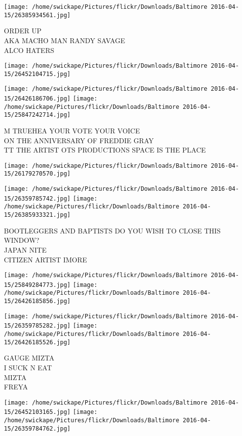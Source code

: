 \documentclass[10pt,letterpaper]{article}
\begin{document}
\texttt{[image: /home/swickape/Pictures/flickr/Downloads/Baltimore 2016-04-15/26385934561.jpg]}

ORDER UP\\
AKA MACHO MAN RANDY SAVAGE\\
ALCO HATERS
\pagebreak

\texttt{[image: /home/swickape/Pictures/flickr/Downloads/Baltimore 2016-04-15/26452104715.jpg]}

\vspace{0.25in}
\texttt{[image: /home/swickape/Pictures/flickr/Downloads/Baltimore 2016-04-15/26426186706.jpg]}
\texttt{[image: /home/swickape/Pictures/flickr/Downloads/Baltimore 2016-04-15/25847242714.jpg]}

M TRUEHEA YOUR VOTE YOUR VOICE\\
ON THE ANNIVERSARY OF FREDDIE GRAY\\
TT THE ARTIST OTS PRODUCTIONS SPACE IS THE PLACE
\pagebreak

\texttt{[image: /home/swickape/Pictures/flickr/Downloads/Baltimore 2016-04-15/26179270570.jpg]}

\vspace{0.25in}
\texttt{[image: /home/swickape/Pictures/flickr/Downloads/Baltimore 2016-04-15/26359785742.jpg]}
\texttt{[image: /home/swickape/Pictures/flickr/Downloads/Baltimore 2016-04-15/26385933321.jpg]}

BOOTLEGGERS AND BAPTISTS DO YOU WISH TO CLOSE THIS WINDOW?\\
JAPAN NITE\\
CITIZEN ARTIST IMORE
\pagebreak

\texttt{[image: /home/swickape/Pictures/flickr/Downloads/Baltimore 2016-04-15/25849284773.jpg]}
\texttt{[image: /home/swickape/Pictures/flickr/Downloads/Baltimore 2016-04-15/26426185856.jpg]}

\texttt{[image: /home/swickape/Pictures/flickr/Downloads/Baltimore 2016-04-15/26359785282.jpg]}
\texttt{[image: /home/swickape/Pictures/flickr/Downloads/Baltimore 2016-04-15/26426185526.jpg]}

GAUGE MIZTA\\
I SUCK N EAT\\
MIZTA\\
FREYA
\pagebreak

\texttt{[image: /home/swickape/Pictures/flickr/Downloads/Baltimore 2016-04-15/26452103165.jpg]}
\texttt{[image: /home/swickape/Pictures/flickr/Downloads/Baltimore 2016-04-15/26359784762.jpg]}
\end{document}
